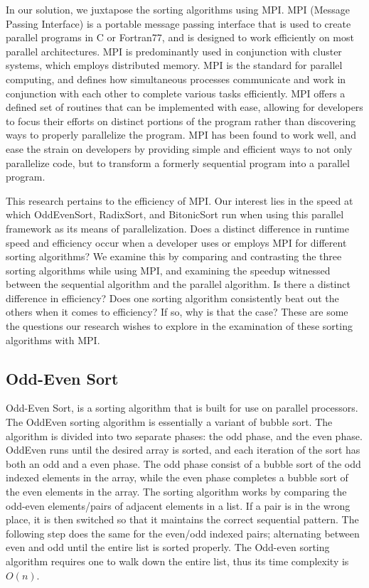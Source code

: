 \documentclass[11pt,twocolumn]{article}
\begin{document}
In our solution, we juxtapose the sorting algorithms using MPI. MPI (Message Passing Interface) is a portable message passing interface that is used to create parallel programs in C or Fortran77, and is designed to work efficiently on most parallel architectures. MPI is predominantly used in conjunction with cluster systems, which employs distributed memory. MPI is the standard for parallel computing, and defines how simultaneous processes communicate and work in conjunction with each other to complete various tasks efficiently. MPI offers a defined set of routines that can be implemented with ease, allowing for developers to focus their efforts on distinct portions of the program rather than discovering ways to properly parallelize the program.
MPI has been found to work well, and ease the strain on developers by providing simple and efficient ways to not only parallelize code, but to transform a formerly sequential program into a parallel program. 


This research pertains to the efficiency of MPI. Our interest lies in the speed at which OddEvenSort, RadixSort, and BitonicSort run when using this parallel framework as its means of parallelization. Does a distinct difference in runtime speed and efficiency occur when a developer uses or employs MPI for different sorting algorithms? We examine this by comparing and contrasting the three sorting algorithms while using MPI, and examining the speedup witnessed between the sequential algorithm and the parallel algorithm. Is there a distinct difference in efficiency? Does one sorting algorithm consistently beat out the others when it comes to efficiency? If so, why is that the case? These are some the questions our research wishes to explore in the examination of these sorting algorithms with MPI. 



\subsection{Odd-Even Sort}
Odd-Even Sort, is a sorting algorithm that is built for use on parallel processors. The OddEven sorting algorithm is essentially a variant of bubble sort. The algorithm is divided into two separate phases: the odd phase, and the even phase. OddEven runs until the desired array is sorted, and each iteration of the sort has both an odd and a even phase. The odd phase consist of a bubble sort of the odd indexed elements in the array, while the even phase completes a bubble sort of the even elements in the array. The sorting algorithm works by comparing the odd-even elements/pairs of adjacent elements in a list. If a pair is in the wrong place, it is then switched so that it maintains the correct sequential pattern. The following step does the same for the even/odd indexed pairs; alternating between even and odd until the entire list is sorted properly. The Odd-even sorting algorithm requires one to walk down the entire list, thus its time complexity is $O(n)$.
\end{document}
